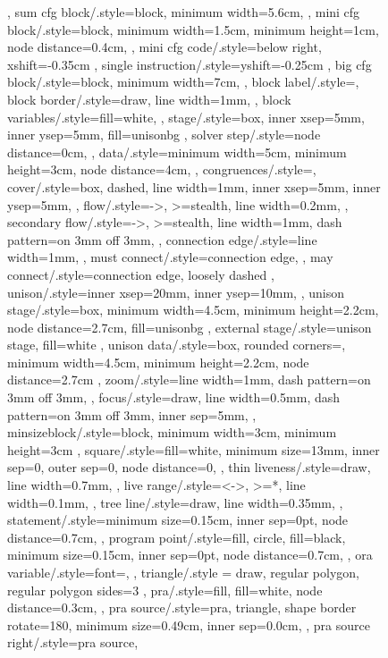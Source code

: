 \documentclass[acmsmall,authorversion,nonacm]{acmart}
\begin{document}
\begin{figure}
{{{{{  },
  sum cfg block/.style={block,
    minimum width=5.6cm,
  },
  mini cfg block/.style={block,
    minimum width=1.5cm,
    minimum height=1cm,
    node distance=0.4cm,
  },
  mini cfg code/.style={below right,
    xshift=-0.35cm
  },
  single instruction/.style={yshift=-0.25cm
  },
  big cfg block/.style={block,
    minimum width=7cm,
  },
  block label/.style={},
  block border/.style={draw,
    line width=1mm,
  },
  block variables/.style={fill=white,
  },
  stage/.style={box,
    inner xsep=5mm,
    inner ysep=5mm,
    fill=unisonbg
  },
  solver step/.style={node distance=0cm,
  },
  data/.style={minimum width=5cm,
    minimum height=3cm,
    node distance=4cm,
  },
  congruences/.style={},
  cover/.style={box,
    dashed,
    line width=1mm,
    inner xsep=5mm,
    inner ysep=5mm,
  },
  flow/.style={->,
    >=stealth,
    line width=0.2mm,
  },
  secondary flow/.style={->,
    >=stealth,
    line width=1mm,
    dash pattern=on 3mm off 3mm,
  },
  connection edge/.style={line width=1mm,
  },
  must connect/.style={connection edge,
  },
  may connect/.style={connection edge,
    loosely dashed
  },
  unison/.style={inner xsep=20mm,
    inner ysep=10mm,
  },
  unison stage/.style={box,
    minimum width=4.5cm,
    minimum height=2.2cm,
    node distance=2.7cm,
    fill=unisonbg
  },
  external stage/.style={unison stage,
    fill=white
  },
  unison data/.style={box,
    rounded corners=\cornerRadius,
    minimum width=4.5cm,
    minimum height=2.2cm,
    node distance=2.7cm
  },
  zoom/.style={line width=1mm,
    dash pattern=on 3mm off 3mm,
  },
  focus/.style={draw,
    line width=0.5mm,
    dash pattern=on 3mm off 3mm,
    inner sep=5mm,
  },
  minsizeblock/.style={block,
    minimum width=3cm,
    minimum height=3cm
  },
  square/.style={fill=white,
    minimum size=13mm,
    inner sep=0,
    outer sep=0,
    node distance=0,
  },
  thin liveness/.style={draw,
    line width=0.7mm,
  },
  live range/.style={<->,
      >=*,
      line width=0.1mm,
    },
  tree line/.style={draw,
    line width=0.35mm,
  },
  statement/.style={minimum size=0.15cm,
    inner sep=0pt,
    node distance=0.7cm,
  },
  program point/.style={fill,
    circle,
    fill=black,
    minimum size=0.15cm,
    inner sep=0pt,
    node distance=0.7cm,
  },
  ora variable/.style={font=\small,
  },
  triangle/.style = {draw, regular polygon, regular polygon sides=3 },
  pra/.style={fill,
    fill=white,
    node distance=0.3cm,
  },
  pra source/.style={pra,
    triangle,
    shape border rotate=180,
    minimum size=0.49cm,
    inner sep=0.0cm,
  },
  pra source right/.style={pra source,
}}}}}
\end{figure}
\end{document}
